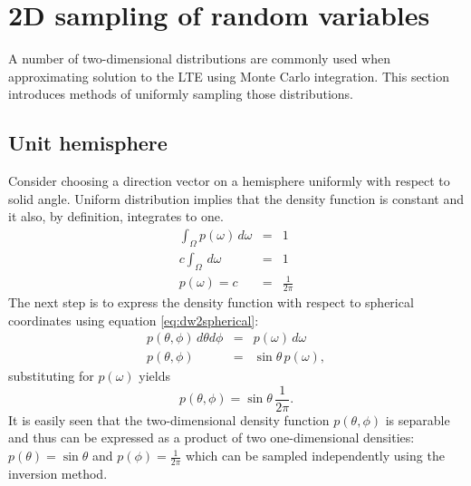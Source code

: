 \section{2D sampling of random variables}
A number of two-dimensional distributions are commonly used when approximating solution to the LTE using Monte Carlo integration. This section introduces methods of uniformly sampling those distributions.

\subsection{Unit hemisphere}
Consider choosing a direction vector on a hemisphere uniformly with respect to solid angle. Uniform distribution implies that the density function is constant and it also, by definition, integrates to one.
\begin{eqnarray}
  \int_{\Omega} p(\omega) \,d\omega &=& 1 \nonumber \\
  c \int_{\Omega} \,d\omega &=& 1 \nonumber \\
  p(\omega) = c &=& \frac{1}{2\pi}
\end{eqnarray}
The next step is to express the density function with respect to spherical coordinates using equation \ref{eq:dw2spherical}:
\begin{eqnarray}
  p(\theta, \phi) \, d\theta d\phi &=& p(\omega) \,d\omega \nonumber \\
  p(\theta, \phi) &=& \sin\theta \,p(\omega),
\end{eqnarray}
substituting for $p(\omega)$ yields
\begin{equation}
  p(\theta, \phi) = \sin\theta \,\frac{1}{2\pi}.
\end{equation}
It is easily seen that the two-dimensional density function $p(\theta, \phi)$ is separable and thus can be expressed as a product of two one-dimensional densities: $p(\theta) = \sin\theta$ and $p(\phi) = \frac{1}{2\pi}$ which can be sampled independently using the inversion method.

